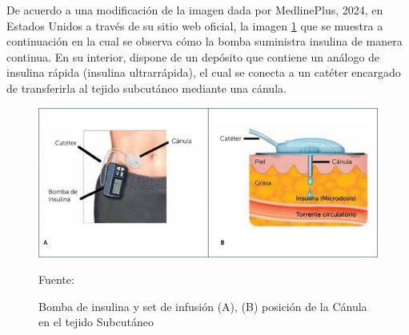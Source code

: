 De acuerdo a una modificación de la imagen dada por MedlinePlus, 2024, en Estados Unidos a través de su sitio web oficial, la imagen \ref{fig:bomba-insul} que se muestra a continuación en la cual se observa cómo la bomba suministra insulina de manera continua. En su interior, dispone de un depósito que contiene un análogo de insulina rápida (insulina ultrarrápida), el cual se conecta a un catéter encargado de transferirla al tejido subcutáneo mediante una cánula.


\begin{figure}[H]
	\centering
	\includegraphics[width=0.7\linewidth]{figures/bomba-insul}
	\caption{Bomba de insulina y set de infusión (A), (B) posición de la Cánula en el tejido Subcutáneo}
	Fuente:\cite{apablaza-2016}
	\label{fig:bomba-insul}
\end{figure}


 

